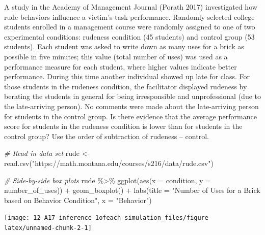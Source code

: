 \documentclass[
]{report}
\newenvironment{Shaded}{\begin{snugshade}}{\end{snugshade}}
\newcommand{\AttributeTok}[1]{\textcolor[rgb]{0.77,0.63,0.00}{#1}}
\newcommand{\CommentTok}[1]{\textcolor[rgb]{0.56,0.35,0.01}{\textit{#1}}}
\newcommand{\FunctionTok}[1]{\textcolor[rgb]{0.00,0.00,0.00}{#1}}
\newcommand{\NormalTok}[1]{#1}
\newcommand{\OtherTok}[1]{\textcolor[rgb]{0.56,0.35,0.01}{#1}}
\newcommand{\SpecialCharTok}[1]{\textcolor[rgb]{0.00,0.00,0.00}{#1}}
\newcommand{\StringTok}[1]{\textcolor[rgb]{0.31,0.60,0.02}{#1}}
\begin{document}
A study in the Academy of Management Journal (Porath 2017) investigated how rude behaviors influence a victim's task performance. Randomly selected college students enrolled in a management course were randomly assigned to one of two experimental conditions: rudeness condition (45 students) and control group (53 students). Each student was asked to write down as many uses for a brick as possible in five minutes; this value (total number of uses) was used as a performance measure for each student, where higher values indicate better performance. During this time another individual showed up late for class. For those students in the rudeness condition, the facilitator displayed rudeness by berating the students in general for being irresponsible and unprofessional (due to the late-arriving person). No comments were made about the late-arriving person for students in the control group. Is there evidence that the average performance score for students in the rudeness condition is lower than for students in the control group? Use the order of subtraction of rudeness -- control.

\begin{Shaded}
\begin{Highlighting}[]
\CommentTok{\# Read in data set}
\NormalTok{rude }\OtherTok{\textless{}{-}} \FunctionTok{read.csv}\NormalTok{(}\StringTok{"https://math.montana.edu/courses/s216/data/rude.csv"}\NormalTok{)}
\end{Highlighting}
\end{Shaded}

\newpage

\begin{Shaded}
\begin{Highlighting}[]
\CommentTok{\# Side{-}by{-}side box plots}
\NormalTok{rude }\SpecialCharTok{\%\textgreater{}\%}
\FunctionTok{ggplot}\NormalTok{(}\FunctionTok{aes}\NormalTok{(}\AttributeTok{x =}\NormalTok{ condition, }\AttributeTok{y =}\NormalTok{ number\_of\_uses)) }\SpecialCharTok{+}
    \FunctionTok{geom\_boxplot}\NormalTok{() }\SpecialCharTok{+} 
    \FunctionTok{labs}\NormalTok{(}\AttributeTok{title =} \StringTok{"Number of Uses for a Brick based on Behavior Condition"}\NormalTok{,}
         \AttributeTok{x =} \StringTok{"Behavior"}\NormalTok{) }
\end{Highlighting}
\end{Shaded}

\begin{center}\texttt{[image: 12-A17-inference-1ofeach-simulation\_files/figure-latex/unnamed-chunk-2-1]} \end{center}
\end{document}
